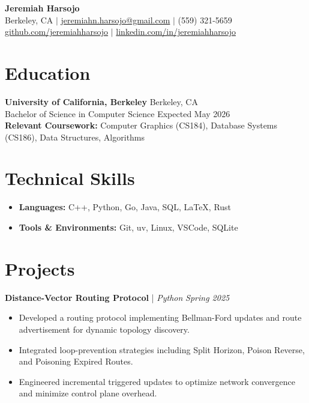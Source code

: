 \documentclass[11pt, letterpaper]{article}
\begin{document}
\begin{center}
    {\huge \textbf{Jeremiah Harsojo}} \\ \vspace{2pt}
    Berkeley, CA $|$ \href{mailto:jeremiahn.harsojo@gmail.com}{jeremiahn.harsojo@gmail.com} $|$ (559) 321-5659 \\
    \href{https://github.com/jeremiahharsojo}{github.com/jeremiahharsojo} $|$ \href{https://linkedin.com/in/jeremiahharsojo}{linkedin.com/in/jeremiahharsojo}
\end{center}

\section{Education}
\textbf{University of California, Berkeley} \hfill Berkeley, CA \\
Bachelor of Science in Computer Science \hfill Expected May 2026 \\
\textbf{Relevant Coursework:} Computer Graphics (CS184), Database Systems (CS186), Data Structures, Algorithms

\section{Technical Skills}
\begin{itemize}[leftmargin=0.15in, label={}]
    \item \textbf{Languages:} C++, Python, Go, Java, SQL, LaTeX, Rust
    \item \textbf{Tools \& Environments:} Git, uv, Linux, VSCode, SQLite
\end{itemize}

\section{Projects}

\textbf{Distance-Vector Routing Protocol} | \textit{Python} \hfill \textit{Spring 2025}
\begin{itemize}[leftmargin=0.25in, itemsep=1pt]
\item Developed a routing protocol implementing Bellman-Ford updates and route advertisement for dynamic topology discovery.
\item Integrated loop-prevention strategies including Split Horizon, Poison Reverse, and Poisoning Expired Routes.
\item Engineered incremental triggered updates to optimize network convergence and minimize control plane overhead.
\end{itemize}
\end{document}
